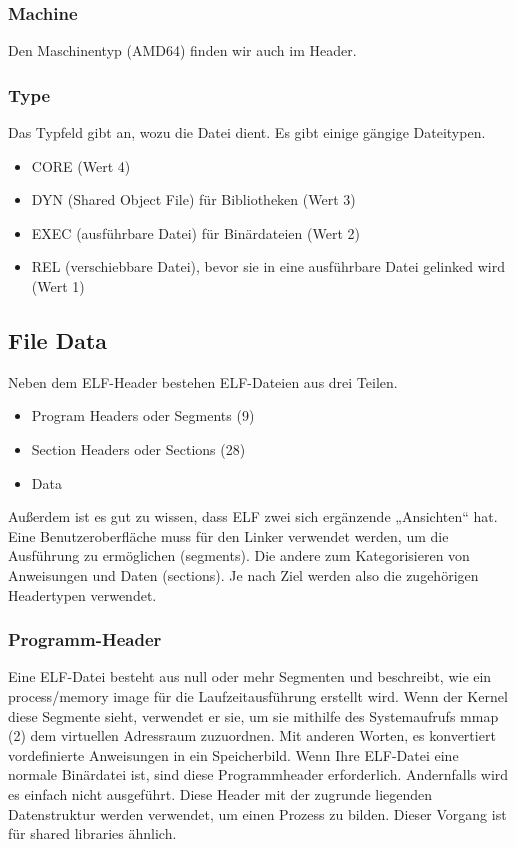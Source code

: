 \subsubsection{Machine}
Den Maschinentyp (AMD64) finden wir auch im Header.

\subsubsection{Type}
Das Typfeld gibt an, wozu die Datei dient. Es gibt einige gängige Dateitypen.

\begin{itemize}
\item CORE (Wert 4)
\item DYN (Shared Object File) für Bibliotheken (Wert 3)
\item EXEC (ausführbare Datei) für Binärdateien (Wert 2)
\item REL (verschiebbare Datei), bevor sie in eine ausführbare Datei gelinked wird (Wert 1)
\end{itemize}

\subsection{File Data}
Neben dem ELF-Header bestehen ELF-Dateien aus drei Teilen.

\begin{itemize}
\item Program Headers oder Segments (9)
\item Section Headers oder Sections (28)
\item Data
\end{itemize}

Außerdem ist es gut zu wissen, dass ELF zwei sich ergänzende „Ansichten“ hat. Eine Benutzeroberfläche muss für den Linker verwendet werden, um die Ausführung zu ermöglichen (segments). Die andere zum Kategorisieren von Anweisungen und Daten (sections). Je nach Ziel werden also die zugehörigen Headertypen verwendet.

\subsubsection{Programm-Header}
Eine ELF-Datei besteht aus null oder mehr Segmenten und beschreibt, wie ein process/memory image für die Laufzeitausführung erstellt wird. Wenn der Kernel diese Segmente sieht, verwendet er sie, um sie mithilfe des Systemaufrufs mmap (2) dem virtuellen Adressraum zuzuordnen. Mit anderen Worten, es konvertiert vordefinierte Anweisungen in ein Speicherbild. Wenn Ihre ELF-Datei eine normale Binärdatei ist, sind diese Programmheader erforderlich. Andernfalls wird es einfach nicht ausgeführt. Diese Header mit der zugrunde liegenden Datenstruktur werden verwendet, um einen Prozess zu bilden. Dieser Vorgang ist für shared libraries ähnlich.

